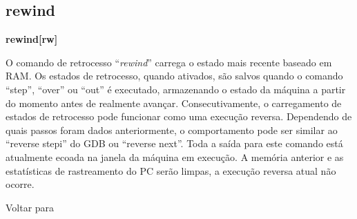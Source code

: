 \documentclass[letterpaper,10pt,brazil]{sphinxmanual}
\begin{document}
\subsection{rewind}
\label{debugger/general:debugger-command-rewind}\label{debugger/general:rewind}
\begin{DUlineblock}{0em}
\item[]
\begin{DUlineblock}{\DUlineblockindent}
\item[] \textbf{rewind{[}rw{]}}
\item[] 
\end{DUlineblock}
\item[] O comando de retrocesso ``\emph{rewind}'' carrega o estado mais recente baseado em RAM. Os estados de retrocesso, quando ativados, são salvos quando o comando ``step'', ``over'' ou ``out'' é executado, armazenando o estado da máquina a partir do momento antes de realmente avançar. Consecutivamente, o carregamento de estados de retrocesso pode funcionar como uma execução reversa. Dependendo de quais passos foram dados anteriormente, o comportamento pode ser similar ao ``reverse stepi'' do GDB ou ``reverse next''. Toda a saída para este comando está atualmente ecoada na janela da máquina em execução. A memória anterior e as estatísticas de rastreamento do PC serão limpas, a execução reversa atual não ocorre.
\item[] 
\item[] Voltar para {\hyperref[debugger/general:debugger\string-general\string-list]{}}
\end{DUlineblock}
\begin{quote}
\label{debugger/general:debugger-command-statesave}\end{quote}
\end{document}
